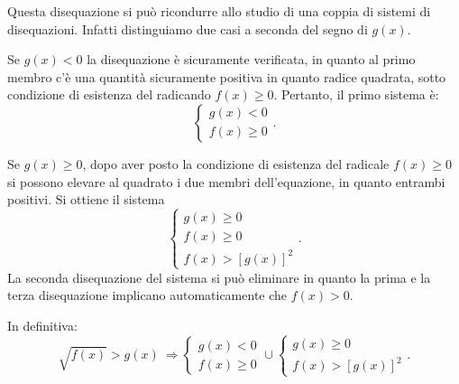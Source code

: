 Questa disequazione si può ricondurre allo studio di una coppia di sistemi di disequazioni. Infatti distinguiamo due casi a seconda del segno di $g(x)$.

\begin{itemize*}
\item Se $ g(x)<0 $ la disequazione è sicuramente verificata, in quanto al primo membro c'è una quantità sicuramente positiva in quanto radice quadrata, sotto condizione di esistenza del radicando $f(x)\ge 0$. Pertanto, il primo sistema è: 
\[\left\{\begin{array}{l}{g(x)<0}\\{f(x)\ge 0}\end{array}\right..\]
\item Se $g(x)\ge 0$, dopo aver posto la condizione di esistenza del radicale $f(x)\ge 0$ si possono elevare al quadrato i due membri dell'equazione, in quanto entrambi positivi. Si ottiene il sistema 
\[\left\{\begin{array}{l}g(x)\ge 0\\f(x)\ge 0 \\f(x)>\left[g(x)\right]^2 \end{array}\right..\]
La seconda disequazione del sistema si può eliminare in quanto la prima e la terza disequazione implicano automaticamente che $f(x)>0$.
\end{itemize*}

In definitiva:
\[\sqrt{f(x)}>g(x) \:\Rightarrow \left\{\begin{array}{l}{g(x)<0}\\{f(x)\ge 0}\end{array}\right.\cup \left\{\begin{array}{l}g(x)\ge 0\\f(x)>\left[g(x)\right]^2\end{array}\right..\]


